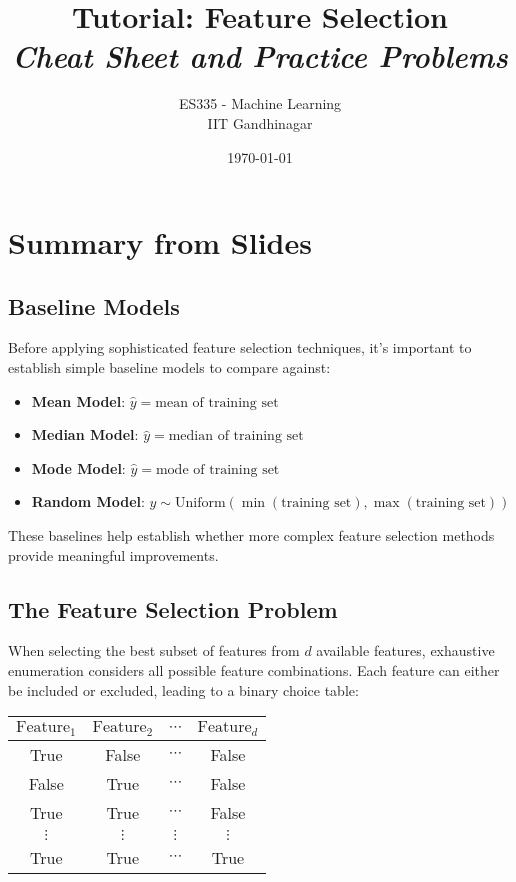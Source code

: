 \documentclass{article}
\title{\textbf{Tutorial: Feature Selection} \\ \textit{Cheat Sheet and Practice Problems}}
\author{ES335 - Machine Learning \\ IIT Gandhinagar}
\date{\today}
\begin{document}
\maketitle

\section{Summary from Slides}

\subsection{Baseline Models}

Before applying sophisticated feature selection techniques, it's important to establish simple baseline models to compare against:

\begin{itemize}
    \item \textbf{Mean Model}: $\hat{y} = \text{mean of training set}$
    \item \textbf{Median Model}: $\hat{y} = \text{median of training set}$  
    \item \textbf{Mode Model}: $\hat{y} = \text{mode of training set}$
    \item \textbf{Random Model}: $\hat{y} \sim \text{Uniform}(\min(\text{training set}), \max(\text{training set}))$
\end{itemize}

These baselines help establish whether more complex feature selection methods provide meaningful improvements.

\subsection{The Feature Selection Problem}

When selecting the best subset of features from $d$ available features, exhaustive enumeration considers all possible feature combinations. Each feature can either be included or excluded, leading to a binary choice table:

\begin{center}
\begin{tabular}{c|c|c|c}
$\text{Feature}_1$ & $\text{Feature}_2$ & $\cdots$ & $\text{Feature}_d$ \\
\hline
True & False & $\cdots$ & False \\
False & True & $\cdots$ & False \\
True & True & $\cdots$ & False \\
$\vdots$ & $\vdots$ & $\vdots$ & $\vdots$ \\
True & True & $\cdots$ & True \\
\end{tabular}
\end{center}
\end{document}
